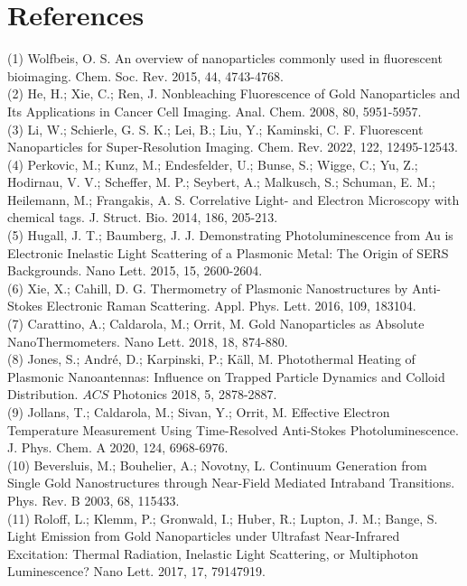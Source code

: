 \documentclass[10pt]{article}
\begin{document}
\section*{References}
(1) Wolfbeis, O. S. An overview of nanoparticles commonly used in fluorescent bioimaging. Chem. Soc. Rev. 2015, 44, 4743-4768.\\
(2) He, H.; Xie, C.; Ren, J. Nonbleaching Fluorescence of Gold Nanoparticles and Its Applications in Cancer Cell Imaging. Anal. Chem. 2008, 80, 5951-5957.\\
(3) Li, W.; Schierle, G. S. K.; Lei, B.; Liu, Y.; Kaminski, C. F. Fluorescent Nanoparticles for Super-Resolution Imaging. Chem. Rev. 2022, 122, 12495-12543.\\
(4) Perkovic, M.; Kunz, M.; Endesfelder, U.; Bunse, S.; Wigge, C.; Yu, Z.; Hodirnau, V. V.; Scheffer, M. P.; Seybert, A.; Malkusch, S.; Schuman, E. M.; Heilemann, M.; Frangakis, A. S. Correlative Light- and Electron Microscopy with chemical tags. J. Struct. Bio. 2014, 186, 205-213.\\
(5) Hugall, J. T.; Baumberg, J. J. Demonstrating Photoluminescence from Au is Electronic Inelastic Light Scattering of a Plasmonic Metal: The Origin of SERS Backgrounds. Nano Lett. 2015, 15, 2600-2604.\\
(6) Xie, X.; Cahill, D. G. Thermometry of Plasmonic Nanostructures by Anti-Stokes Electronic Raman Scattering. Appl. Phys. Lett. 2016, 109, 183104.\\
(7) Carattino, A.; Caldarola, M.; Orrit, M. Gold Nanoparticles as Absolute NanoThermometers. Nano Lett. 2018, 18, 874-880.\\
(8) Jones, S.; André, D.; Karpinski, P.; Käll, M. Photothermal Heating of Plasmonic Nanoantennas: Influence on Trapped Particle Dynamics and Colloid Distribution. $A C S$ Photonics 2018, 5, 2878-2887.\\
(9) Jollans, T.; Caldarola, M.; Sivan, Y.; Orrit, M. Effective Electron Temperature Measurement Using Time-Resolved Anti-Stokes Photoluminescence. J. Phys. Chem. A 2020, 124, 6968-6976.\\
(10) Beversluis, M.; Bouhelier, A.; Novotny, L. Continuum Generation from Single Gold Nanostructures through Near-Field Mediated Intraband Transitions. Phys. Rev. B 2003, 68, 115433.\\
(11) Roloff, L.; Klemm, P.; Gronwald, I.; Huber, R.; Lupton, J. M.; Bange, S. Light Emission from Gold Nanoparticles under Ultrafast Near-Infrared Excitation: Thermal Radiation, Inelastic Light Scattering, or Multiphoton Luminescence? Nano Lett. 2017, 17, 79147919.\\
\end{document}
